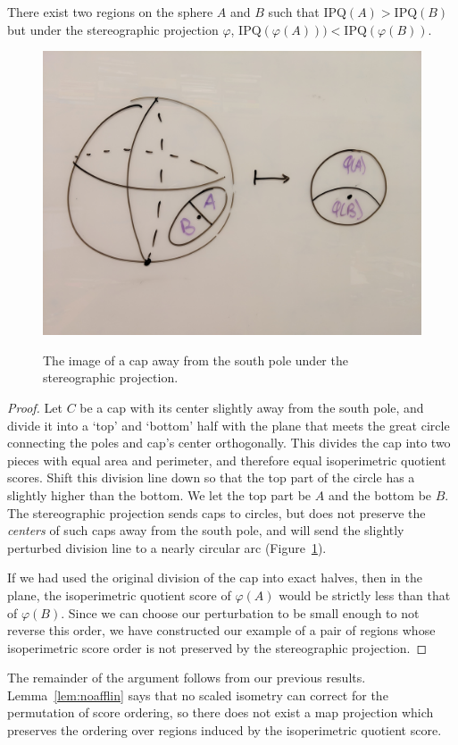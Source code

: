 \begin{theorem}
There exist two regions on the sphere $A$ and $B$ such that $\mathrm{IPQ}(A)>\mathrm{IPQ}(B)$ but under the stereographic projection $\varphi$, $\mathrm{IPQ}(\varphi(A)))<\mathrm{IPQ}(\varphi(B))$.
\end{theorem}

\begin{figure}
    \centering
    \includegraphics[width=.8\textwidth]{figs/stereo_ipq.jpg}\\
    \caption{ The image of a cap away from the south pole under the stereographic projection. }
    \label{fig:stereoipq}
\end{figure}



\begin{proof}
Let $C$ be a cap with its center slightly away from the south pole, and divide it into a `top' and `bottom' half with the plane that meets the great circle connecting the poles and cap's center orthogonally.  This divides the cap into two pieces with equal area and perimeter, and therefore equal isoperimetric quotient scores.  Shift this division line down so that the top part of the circle has a slightly higher than the bottom.  We let the top part be $A$ and the bottom be $B$.  The stereographic projection sends caps to circles, but does not preserve the \textit{centers} of such caps away from the south pole, and will send the slightly perturbed division line to a nearly circular arc (Figure~\ref{fig:stereoipq}).  

If we had used the original division of the cap into exact halves, then in the plane, the isoperimetric quotient score of $\varphi(A)$ would be strictly less than that of $\varphi(B)$. Since we can choose our perturbation to be small enough to not reverse this order, we have constructed our example of a pair of regions whose isoperimetric score order is not preserved by the stereographic projection.

\end{proof}


The remainder of the argument follows from our previous results.  Lemma~\ref{lem:noafflin} says that no scaled isometry can correct for the permutation of score ordering, so there does not exist a map projection which preserves the ordering over regions induced by the isoperimetric quotient score.






